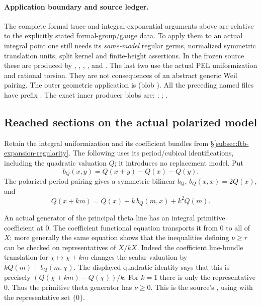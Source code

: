 \paragraph{Application boundary and source ledger.}
The complete formal trace and integral-exponential arguments above are
relative to the explicitly stated formal-group/gauge data.
To apply them to an actual integral point one still needs its
\emph{same-model} regular germs, normalized symmetric translation units,
split kernel and finite-height assertions.
In the frozen source these are produced by
,
,
,
,
and .
The last two use the actual PEL uniformization and rational torsion.
They are not consequences of an abstract generic Weil pairing.
The outer geometric application is
(blob ).
All the preceding named files have prefix
.
The exact inner producer blobs are:
;
;
.

\subsection{Reached sections on the actual polarized model}
\label{subsec:ftb-reached-sections}

Retain the integral uniformization and its coefficient bundles from
\S\ref{subsec:ftb-expansion-regularity}.
The following uses its period/cubical identifications, including the
quadratic valuation \(Q\); it introduces no replacement model.
Put
\[
 b_Q(x,y)=Q(x+y)-Q(x)-Q(y).
\]
The polarized period pairing gives a symmetric bilinear \(b_Q\),
\(b_Q(x,x)=2Q(x)\), and
\[
 Q(x+km)=Q(x)+k\,b_Q(m,x)+k^2Q(m).
\]

An actual generator of the principal theta line has an integral
primitive coefficient at \(0\).
The coefficient functional equation transports it from \(0\) to all
of \(X\); more generally the same equation shows that the inequalities
defining \(\nu\ge r\) can be checked on representatives of \(X/kX\).
Indeed the coefficient line-bundle translation for
\(\chi\mapsto\chi+km\) changes the scalar valuation by
\(kQ(m)+b_Q(m,\chi)\).  The displayed quadratic identity says that
this is precisely
\((Q(\chi+km)-Q(\chi))/k\).
For \(k=1\) there is only the representative \(0\).
Thus the primitive theta generator has \(\nu\ge0\).
This is the source's
, using
 with the representative set
\(\{0\}\).

